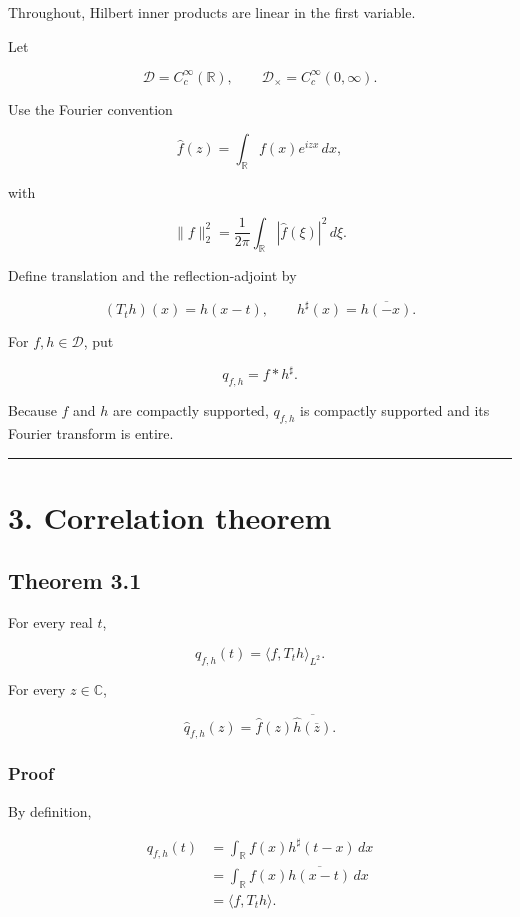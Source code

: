 Throughout, Hilbert inner products are linear in the first variable.

Let

\[
\mathcal D=C_c^\infty(\mathbb R),
\qquad
\mathcal D_\times=C_c^\infty(0,\infty).
\]

Use the Fourier convention

\[
\boxed{
\widehat f(z)
=\int_{\mathbb R}f(x)e^{izx}\,dx,
}
\tag{2.1}
\]

with

\[
\|f\|_2^2
=\frac1{2\pi}\int_{\mathbb R}|\widehat f(\xi)|^2\,d\xi.
\]

Define translation and the reflection-adjoint by

\[
(T_th)(x)=h(x-t),
\qquad
h^\sharp(x)=\overline{h(-x)}.
\tag{2.2}
\]

For \(f,h\in\mathcal D\), put

\[
\boxed{
q_{f,h}=f*h^\sharp.
}
\tag{2.3}
\]

Because \(f\) and \(h\) are compactly supported, \(q_{f,h}\) is compactly
supported and its Fourier transform is entire.

\begin{center}\rule{0.5\linewidth}{0.5pt}\end{center}

\hypertarget{correlation-theorem}{%
\section{3. Correlation theorem}\label{correlation-theorem}}

\hypertarget{theorem-3.1}{%
\subsection{Theorem 3.1}\label{theorem-3.1}}

For every real \(t\),

\[
\boxed{
q_{f,h}(t)=\langle f,T_th\rangle_{L^2}.
}
\tag{3.1}
\]

For every \(z\in\mathbb C\),

\[
\boxed{
\widehat q_{f,h}(z)
=
\widehat f(z)
\overline{\widehat h(\overline z)}.
}
\tag{3.2}
\]

\hypertarget{proof}{%
\subsubsection{Proof}\label{proof}}

By definition,

\[
\begin{aligned}
q_{f,h}(t)
&=\int_{\mathbb R}f(x)h^\sharp(t-x)\,dx\\
&=\int_{\mathbb R}f(x)\overline{h(x-t)}\,dx\\
&=\langle f,T_th\rangle.
\end{aligned}
\]

